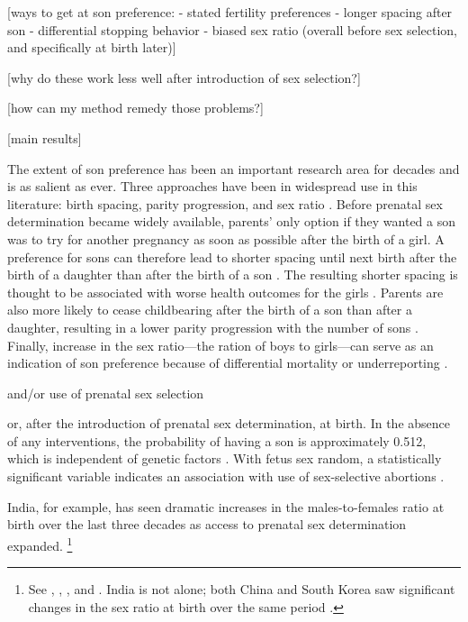 \documentclass[12pt,letterpaper]{article}
\begin{document}
[ways to get at son preference:
- stated fertility preferences
- longer spacing after son
- differential stopping behavior
- biased sex ratio (overall before sex selection, and specifically at birth later)]

[why do these work less well after introduction of sex selection?]

[how can my method remedy those problems?]

[main results]


The extent of son preference has been an important research area for 
decades and is as salient as ever.
Three approaches have been in widespread use in this literature:
birth spacing, parity progression, and sex ratio \citep{Leung1988}.
Before prenatal sex determination became widely available, parents' only 
option if they wanted a son was to try for another pregnancy as soon as 
possible after the birth of a girl.
A preference for sons can therefore lead to shorter spacing until next 
birth after the birth of a daughter than after the birth of a son 
\citep{Das1987,Rahman1993,Pong1994,Haughton1996,Arnold1997}.
The resulting shorter spacing is thought to be associated with worse 
health outcomes for the girls 
\citep{arnold98,Whitworth2002,Rutstein2005,Conde-Agudelo2006}.
Parents are also more likely to cease childbearing after the birth of 
a son than after a daughter, resulting in a lower parity progression
with the number of sons \citep{ben-porath76b,Das1987,Arnold1997,clark00}. 
Finally, increase in the sex ratio---the ration of boys to
girls---can serve as an indication of son preference because 
of differential mortality or underreporting \citep{sen90,sen92,Merli2000,anderson08}.



 and/or use of prenatal sex selection

or, after the introduction of prenatal sex determination, at birth.
In the absence of any interventions, the probability of having a son
is approximately 0.512, which is independent of genetic factors 
\citep{ben-porath76b,jacobsen99}.
With fetus sex random, a statistically significant variable indicates an 
association with use of sex-selective abortions \citep{retherford03b,jha06,abrevaya09}. 

India, for example, has seen dramatic increases in the males-to-females ratio 
at birth over the last three decades as access to prenatal sex determination 
expanded.%
\footnote{
See \citet{das_gupta97}, \citet{Sudha1999},
\citet{Arnold2002}, \cite{retherford03b} and \citet{jha06}.
India is not alone; both China and South Korea saw
significant changes in the sex ratio at birth over the same period \citep{Yi1993,park95}.
}
\end{document}
